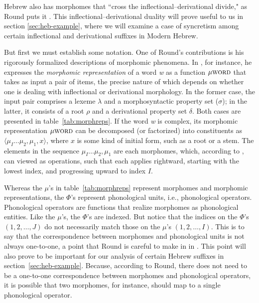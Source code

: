  Hebrew also has morphomes that ``cross the inflectional--derivational divide," 
 as Round puts it \citep[][p.14]{round:2015}. This inflectional--derivational 
 duality will prove useful to us in section \ref{sec:heb-example}, where we will 
 examine a case of syncretism among certain inflectional and derivational suffixes in Modern Hebrew.
  
  But first we must establish some notation. 
  One of Round's contributions is his rigorously formalized descriptions of 
  morphomic phenomena. In \cite{round:2011}, for instance, 
  he expresses the \emph{morphomic representation} of a word 
  \textit{w} as a function $\mu{\textsc{word}}$ that 
  takes as input a pair of items, the precise nature
  of which depends on whether one is dealing with inflectional or 
  derivational morphology. In the former case, the input pair comprises 
  a lexeme $\lambda$ and a morphosyntactic property set ($\sigma$); in the latter, 
  it consists of a root $\rho$ and a derivational property set $\delta$. 
  Both cases are presented in table~\ref{tab:morphreps}. If the word \textit{w} 
 is complex, its morphomic representation $\mu{\textsc{word}}$ 
  can be decomposed (or factorized) into constituents as  
  $\langle  \mu_{I} \dots \mu_{2}, \mu_{1}, x \rangle$, where $x$ 
  is some kind of initial form, such as a root or a stem. The elements in the sequence 
  $ \mu_{I} \dots \mu_{2}, \mu_{1}$ are each morphomes, 
  which, according to \cite{round:2015}, can viewed as operations, 
  such that each applies rightward, starting with the lowest index, and progressing upward
  to index $I$.
  
  Whereas the $\mu$'s in table~\ref{tab:morphreps} represent 
  morphomes and morphomic representations, the $\Phi$'s represent 
  phonological units, i.e., phonological operators. Phonological operators are functions that realize morphomes as phonological entities. 
  Like the $\mu$'s, 
  the $\Phi$'s are indexed. But notice that the  indices on the $\Phi$'s $(1,2,\dots,J)$ 
  do not necessarily match those on the $\mu$'s $(1,2,\dots,I)$. This is to say that
the correspondence between 
  morphomes and phonological units is not always one-to-one, a point that Round is careful to make in 
  in \cite{round:2015}. This point
  will also prove to be important for our analysis of certain Hebrew 
  suffixes in section~\ref{sec:heb-example}. Because, according to Round, there does not need to be a one-to-one correspondence between morphomes and phonological operators, it is possible that two morphomes, for instance, should map to a single phonological operator. 

